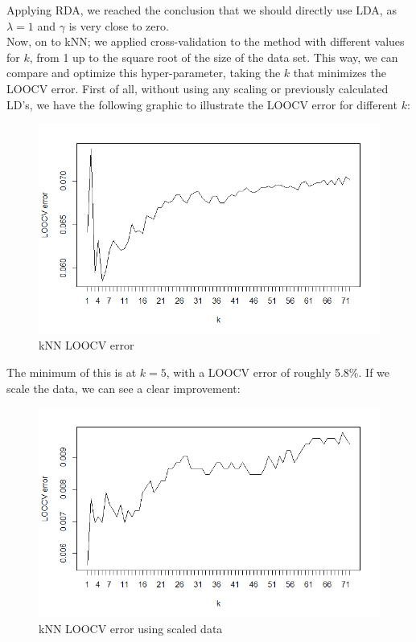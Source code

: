 \documentclass[10pt]{article}
\begin{document}
Applying RDA, we reached the conclusion that we should directly use LDA, as $\lambda=1$ and $\gamma$ is very close to zero.\\

Now, on to kNN; we applied cross-validation to the method with different values for $k$, from 1 up to the square root of the size of the data set. This way, we can compare and optimize this hyper-parameter, taking the $k$ that minimizes the LOOCV error. First of all, without using any scaling or previously calculated LD's, we have the following graphic to illustrate the LOOCV error for different $k$:
\begin{figure}[H]
\centering
\caption{kNN LOOCV error}
\includegraphics[scale=0.5]{kNN_LOOCV_error}
\end{figure}
The minimum of this is at $k=5$, with a LOOCV error of roughly 5.8\%. If we scale the data, we can see a clear improvement:
\begin{figure}[H]
\centering
\caption{kNN LOOCV error using scaled data}
\includegraphics[scale=0.5]{kNN_scaled_LOOCV_error}
\end{figure}
\end{document}
